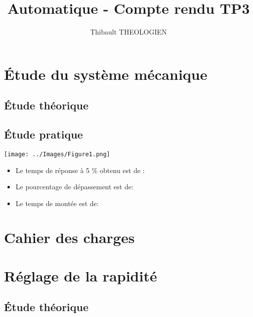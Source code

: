 \documentclass[a4paper,12pt]{article}
\title{Automatique - Compte rendu TP3}
\author{Thibault THEOLOGIEN}
\begin{document}
	\maketitle
	\tableofcontents
	\newpage
	
	\section{Étude du système mécanique}
		\subsection{Étude théorique}	
			\newpage

		\subsection{Étude pratique}
			\begin{center}
				\texttt{[image: ../Images/Figure1.png]} 	
				\begin{itemize}
					\item Le temps de réponse à 5 \% obtenu est de :
					\item Le pourcentage de dépassement est de:
					\item Le temps de montée est de: 			
				\end{itemize}
			\end{center}			
	\newpage
			
	\section{Cahier des charges}
		\newpage	
		
	\section{Réglage de la rapidité}
		\subsection{Étude théorique}
			\newpage
\end{document}
